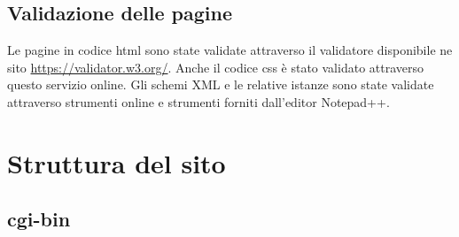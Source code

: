 \documentclass[12pt,a4paper]{article}
\begin{document}
\subsection{Validazione delle pagine}
Le pagine in codice html sono state validate attraverso il validatore disponibile ne sito \url{https://validator.w3.org/}. Anche il codice css è stato validato attraverso questo servizio online. 
Gli schemi XML e le relative istanze sono state validate attraverso strumenti online e strumenti forniti dall'editor Notepad++. 
\appendix
\section{Struttura del sito}
\subsection{cgi-bin}
\end{document}
